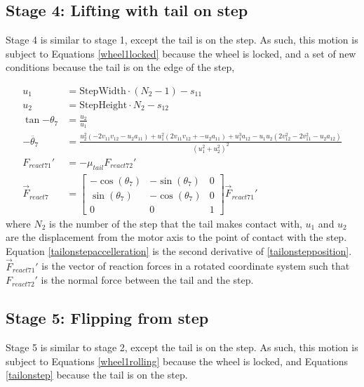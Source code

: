 \subsection*{Stage 4: Lifting with tail on step}
Stage 4 is similar to stage 1, except the tail is on the step. As such, this motion is subject to Equations \ref{wheel1locked} because the wheel is locked, and a set of new conditions because the tail is on the edge of the step,

\begin{subequations}
	\label{tailonstep}
	\begin{align}
		u_1 &= \mathrm{StepWidth}\cdot (N_2-1)- s_{11}\\
		u_2 &= \mathrm{StepHeight}\cdot N_2 - s_{12}\\
		\tan{-\theta_7} &= \frac{u_2}{u_1}\\
		\label{tailonstepposition}
		-\ddot{\theta_7} &= \frac{u_2^2 (-2  v_{11}  v_{12} - u_2  a_{11}) + u_1^2 (2  v_{11}  v_{12} + -u_2 a_{11}) + u_1^3  a_{12} - u_1  u_2  (2 v_{12}^2 - 2  v_{11}^2 - u_2  a_{12})}{(u_1^2 + u_2^2)^2}\\
		\label{tailonstepaccelleration}
		F_{react71}' &= -\mu_{tail} F_{react72}'\\
		\vec{F}_{react7} &= \begin{bmatrix}
			-\cos{(\theta_7)} & -\sin{(\theta_7)} & 0\\
			\sin{(\theta_7)} & -\cos{(\theta_7)} & 0\\
			0 & 0 & 1
		\end{bmatrix} \vec{F}_{react71}'
	\end{align}
\end{subequations}
where $N_2$ is the number of the step that the tail makes contact with, $u_1$ and $u_2$ are the displacement from the motor axis to the point of contact with the step. Equation \ref{tailonstepaccelleration} is the second derivative of \ref{tailonstepposition}. $\vec{F}_{react71}'$ is the vector of reaction forces in a rotated coordinate system such that $F_{react72}'$ is the normal force between the tail and the step.

\subsection*{Stage 5: Flipping from step}
Stage 5 is similar to stage 2, except the tail is on the step. As such, this motion is subject to Equations \ref{wheel1rolling} because the wheel is locked, and Equations \ref{tailonstep} because the tail is on the step.\\

